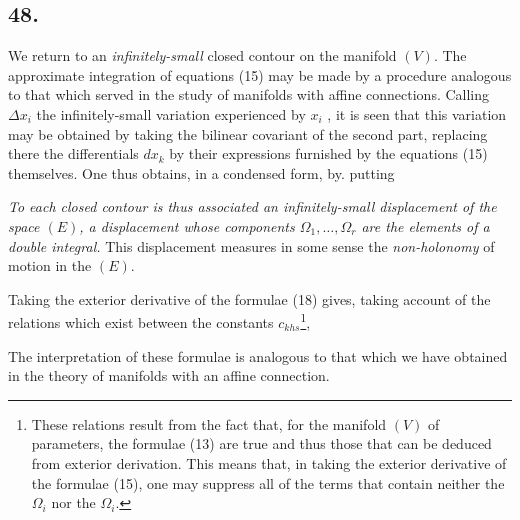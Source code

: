 \subsection*{48.}

We return to an \textit{infinitely-small} closed contour on the manifold $(V)$. The approximate integration of equations (15) may be made by a procedure analogous to that which served in the study of manifolds with affine connections. Calling $\Delta x_i$ the infinitely-small variation experienced by $x_i$ , it is seen that this variation may be obtained by taking the bilinear covariant of the second part, replacing there the differentials $dx_k$ by their expressions furnished by the equations (15) themselves. One thus obtains, in a condensed form,
by. putting

\textit{To each closed contour is thus associated an infinitely-small displacement of the space $(E)$, a displacement whose components $\Omega_1,\dots,\Omega_r$ are the elements of a double integral.} This displacement measures in some sense the \textit{non-holonomy} of motion in the $(E)$.

Taking the exterior derivative of the formulae (18) gives, taking account of the relations which exist between the constants $c_{khs}$\footnote{These relations result from the fact that, for the manifold $(V)$ of parameters, the formulae (13) are true and thus those that can be deduced from exterior derivation. This means that, in taking the exterior derivative of the formulae (15), one may suppress all of the terms that contain neither the $\Omega_i$ nor the $\Omega_i$.},

The interpretation of these formulae is analogous to that which we have obtained in the theory of manifolds with an affine connection.